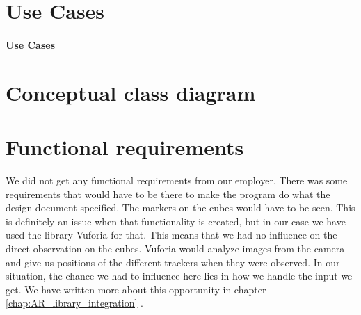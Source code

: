 \section{Use Cases}

\paragraph{Use Cases}

\section{Conceptual class diagram}

\section{Functional requirements}
We did not get any functional requirements from our employer. There was
some requirements that would have to be there to make the program do what the
design document specified. The markers on the cubes would have to be seen. This is definitely an issue when that functionality is created, but in our case we have used the library \gls{Vuforia} for that. This means that we had no influence on the direct observation on the cubes. Vuforia would analyze images from the camera and give us positions of the different trackers when they were observed. In our situation, the chance we had to influence here lies in how we handle the input we get. We have written more about this opportunity in chapter \ref{chap:AR_library_integration} .

